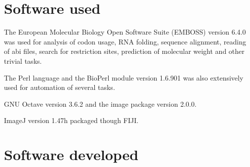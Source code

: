 \section{Software used}
  The European Molecular Biology Open Software Suite (EMBOSS) version 6.4.0
  was used for analysis of codon usage, RNA folding, sequence alignment, reading of abi
  files, search for restriction sites, prediction of molecular weight and
  other trivial tasks.

  The Perl language and the BioPerl module version 1.6.901 was also extensively used for automation of
  several tasks.
  
  GNU Octave version 3.6.2 and the image package version 2.0.0.
  
  ImageJ version 1.47h packaged though FIJI.

\section{Software developed}




